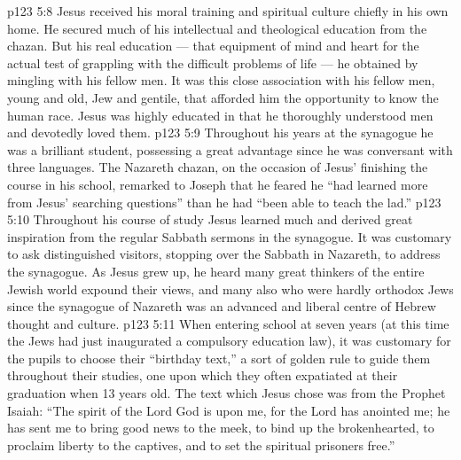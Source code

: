 \vs p123 5:8 Jesus received his moral training and spiritual culture chiefly in his own home. He secured much of his intellectual and theological education from the chazan. But his real education --- that equipment of mind and heart for the actual test of grappling with the difficult problems of life --- he obtained by mingling with his fellow men. It was this close association with his fellow men, young and old, Jew and gentile, that afforded him the opportunity to know the human race. Jesus was highly educated in that he thoroughly understood men and devotedly loved them.
\vs p123 5:9 \pc Throughout his years at the synagogue he was a brilliant student, possessing a great advantage since he was conversant with three languages. The Nazareth chazan, on the occasion of Jesus’ finishing the course in his school, remarked to Joseph that he feared he “had learned more from Jesus’ searching questions” than he had “been able to teach the lad.”
\vs p123 5:10 Throughout his course of study Jesus learned much and derived great inspiration from the regular Sabbath sermons in the synagogue. It was customary to ask distinguished visitors, stopping over the Sabbath in Nazareth, to address the synagogue. As Jesus grew up, he heard many great thinkers of the entire Jewish world expound their views, and many also who were hardly orthodox Jews since the synagogue of Nazareth was an advanced and liberal centre of Hebrew thought and culture.
\vs p123 5:11 When entering school at seven years (at this time the Jews had just inaugurated a compulsory education law), it was customary for the pupils to choose their “birthday text,” a sort of golden rule to guide them throughout their studies, one upon which they often expatiated at their graduation when 13 years old. The text which Jesus chose was from the Prophet Isaiah: “The spirit of the Lord God is upon me, for the Lord has anointed me; he has sent me to bring good news to the meek, to bind up the brokenhearted, to proclaim liberty to the captives, and to set the spiritual prisoners free.”
